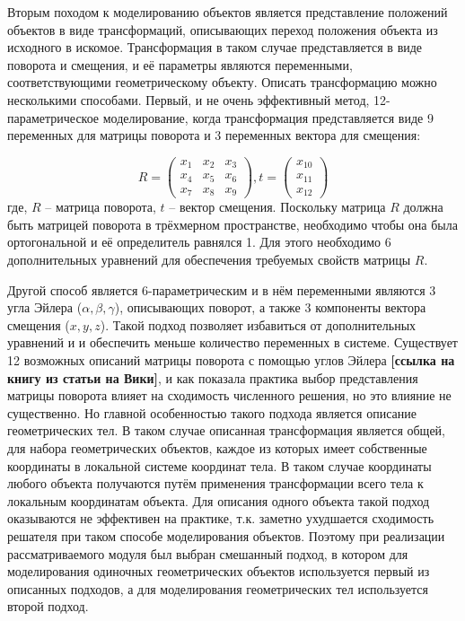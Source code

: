 Вторым походом к моделированию объектов является представление положений объектов в виде трансформаций, описывающих переход положения объекта из исходного в искомое. Трансформация в таком случае представляется в виде поворота и смещения, и её параметры являются переменными, соответствующими геометрическому объекту. Описать трансформацию можно несколькими способами. Первый, и не очень эффективный метод, 12-параметрическое моделирование, когда трансформация представляется виде 9 переменных для матрицы поворота и 3 переменных вектора для смещения:

\begin{equation*}
    R = \begin{pmatrix}
        x_1 & x_2 & x_3\\
        x_4 & x_5 & x_6\\
        x_7 & x_8 & x_9
    \end{pmatrix},
    t = \begin{pmatrix}
        x_{10}\\
        x_{11}\\
        x_{12}
    \end{pmatrix}
\end{equation*}
где, $R$ -- матрица поворота, $t$ -- вектор смещения. Поскольку матрица $R$ должна быть матрицей поворота в трёхмерном пространстве, необходимо чтобы она была ортогональной и её определитель равнялся 1. Для этого необходимо 6 дополнительных уравнений для обеспечения требуемых свойств матрицы $R$.

Другой способ является 6-параметрическим и в нём переменными являются 3 угла Эйлера ($\alpha, \beta, \gamma$), описывающих поворот, а также 3 компоненты вектора смещения ($x, y, z$). Такой подход позволяет избавиться от дополнительных уравнений и и обеспечить меньше количество переменных в системе. Существует 12 возможных описаний матрицы поворота с помощью углов Эйлера \textbf{[ссылка на книгу из статьи на Вики]}, и как показала практика выбор представления матрицы поворота влияет на сходимость численного решения, но это влияние не существенно. Но главной особенностью такого подхода является описание геометрических тел. В таком случае описанная трансформация является общей, для набора геометрических объектов, каждое из которых имеет собственные координаты в локальной системе координат тела. В таком случае координаты любого объекта получаются путём применения трансформации всего тела к локальным координатам объекта. Для описания одного объекта такой подход оказываются не эффективен на практике, т.к. заметно ухудшается сходимость решателя при таком способе моделирования объектов. Поэтому при реализации рассматриваемого модуля был выбран смешанный подход, в котором для моделирования одиночных геометрических объектов используется первый из описанных подходов, а для моделирования геометрических тел используется второй подход. 

